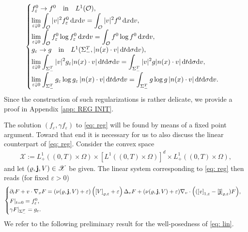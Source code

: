 \documentclass[10pt, reqno]{amsart}
\theoremstyle{plain}
\theoremstyle{definition}
\theoremstyle{remark}
\numberwithin{equation}{section}
\newcommand{\bfj}{{\bf j}}
\newcommand{\calO}{\mathcal O}
\newcommand{\p}{\partial}
\newcommand{\ve}{\varepsilon}
\newcommand{\dx}{\textnormal{d}x}
\newcommand{\dv}{\textnormal{d}v}
\newcommand{\dt}{\textnormal{d}t}
\newcommand{\tnd}{\textnormal{d}}
\newcommand{\lt}{\left}
\newcommand{\rt}{\right}
\newcommand{\renorm}[3]{\lt[#1\rt]_{#2 , #3}}
\begin{document}
\begin{align}\label{ASSUMP f0 g}
\begin{cases}
    f_\ve^0 \to f^0 \quad \text{in} \quad L^1(\calO),\\
    \displaystyle \lim_{\ve\downarrow 0}\int_{\calO} |v|^2 f_\ve^0 \,\dx\dv  = \int_{\calO} |v|^2 f^0 \,\dx\dv,\\[6pt]
    \displaystyle \lim_{\ve\downarrow 0}\int_{\calO} f_\ve^0 \log f_\ve^0 \,\dx\dv = \int_{\calO} f^0 \log f^0 \,\dx\dv, \\
    g_\ve \to g \quad \text{in} \quad L^1(\Sigma_-^T, |n(x)\cdot v|\,\dt\tnd\sigma\dv), \\
    \displaystyle \lim_{\ve\downarrow 0} \int_{\Sigma_-^T} |v|^2 g_\ve |n(x)\cdot v| \,\dt\tnd\sigma\dv = \int_{\Sigma_-^T} |v|^2 g |n(x)\cdot v| \,\dt\tnd\sigma\dv ,\\
    \displaystyle\lim_{\ve\downarrow 0} \int_{\Sigma_-^T} g_\ve \log g_\ve \, |n(x)\cdot v| \,\dt\tnd\sigma\dv = \int_{\Sigma_-^T} g \log g \, |n(x)\cdot v| \,\dt\tnd\sigma\dv.
    \end{cases}
\end{align}
Since the construction of such regularizations is rather delicate, we provide a proof in Appendix \ref{app: REG INIT}.

The solution $(f_\ve, \gamma f_\ve)$ to \eqref{eq: reg} will be found by means of a fixed point argument. Toward that end it is necessary for us to also discuss the linear counterpart of \eqref{eq: reg}. Consider the convex space
\begin{align*}
    \mathscr{X} := L_+^1((0,T)\times\Omega) \times [L^1((0,T)\times\Omega)]^d \times L_+^1((0,T)\times\Omega),
\end{align*}
and let $(\varrho, \bfj, V) \in \mathscr{X}$ be given. The linear system corresponding to \eqref{eq: reg} then reads (for fixed $\ve>0$)
\begin{equation}\label{eq: lin}
    \begin{cases}
    \p_t F + v\cdot \nabla_x F = (\nu(\varrho, \bfj, V) + \ve)  \left( \renorm{V}{\varrho}{\ve} + \ve \right) \Delta_v F + (\nu(\varrho, \bfj, V) + \ve) \nabla_v\cdot \Big( ( \renorm{v}{1}{\ve} - \renorm{\bfj}{\varrho}{\ve}) F \Big), \\
    F|_{t=0} = f_\ve^0 , \\
    \gamma F|_{\Sigma_-^T} = g_\ve.
    \end{cases}
\end{equation}
We refer to the following preliminary result for the well-posedness of \eqref{eq: lin}.
\end{document}
